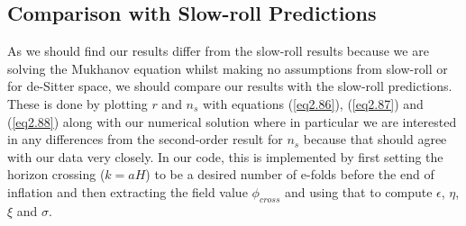 \documentclass[a4paper,12pt,twoside]{report}
\begin{document}
\newpage

\noindent%
\begin{minipage}{\linewidth}%
\label{Fig3.2}
\end{minipage}

\subsection{Comparison with Slow-roll Predictions} \label{subsec:CompSloRoll}

As we should find our results differ from the slow-roll results because we are solving the Mukhanov equation whilst making no assumptions from slow-roll or for de-Sitter space, we should compare our results with the slow-roll predictions. These is done by plotting $r$ and $n_{s}$ with equations (\ref{eq2.86}), (\ref{eq2.87}) and (\ref{eq2.88}) along with our numerical solution where in particular we are interested in any differences from the second-order result for $n_{s}$ because that should agree with our data very closely. In our code, this is implemented by first setting the horizon crossing ($k = aH$) to be a desired number of e-folds before the end of inflation and then extracting the field value $\phi_{cross}$ and using that to compute $\epsilon$, $\eta$, $\xi$ and $\sigma$.
\end{document}
